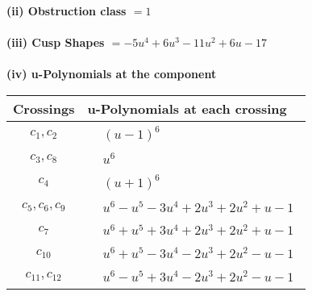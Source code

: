 \documentclass[1p]{elsarticle_modified}
\theoremstyle{definition}
\begin{document}
\flushleft \textbf{(ii) Obstruction class $= 1$}\\~\\
\flushleft \textbf{(iii) Cusp Shapes $= -5 u^4+6 u^3-11 u^2+6 u-17$}\\~\\
\newpage\renewcommand{\arraystretch}{1}
\flushleft \textbf{(iv) u-Polynomials at the component}\newline \\
\begin{tabular}{m{50pt}|m{274pt}}
Crossings & \hspace{64pt}u-Polynomials at each crossing \\
\hline $$\begin{aligned}c_{1},c_{2}\end{aligned}$$&$\begin{aligned}
&(u-1)^6
\end{aligned}$\\
\hline $$\begin{aligned}c_{3},c_{8}\end{aligned}$$&$\begin{aligned}
&u^6
\end{aligned}$\\
\hline $$\begin{aligned}c_{4}\end{aligned}$$&$\begin{aligned}
&(u+1)^6
\end{aligned}$\\
\hline $$\begin{aligned}c_{5},c_{6},c_{9}\end{aligned}$$&$\begin{aligned}
&u^6- u^5-3 u^4+2 u^3+2 u^2+u-1
\end{aligned}$\\
\hline $$\begin{aligned}c_{7}\end{aligned}$$&$\begin{aligned}
&u^6+u^5+3 u^4+2 u^3+2 u^2+u-1
\end{aligned}$\\
\hline $$\begin{aligned}c_{10}\end{aligned}$$&$\begin{aligned}
&u^6+u^5-3 u^4-2 u^3+2 u^2- u-1
\end{aligned}$\\
\hline $$\begin{aligned}c_{11},c_{12}\end{aligned}$$&$\begin{aligned}
&u^6- u^5+3 u^4-2 u^3+2 u^2- u-1
\end{aligned}$\\
\hline
\end{tabular}\\~\\
\end{document}

